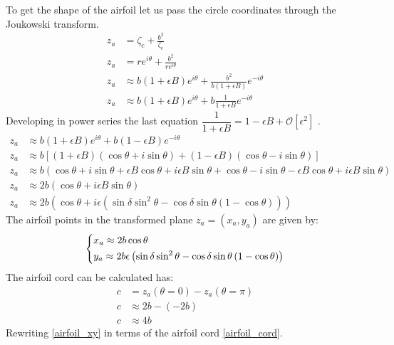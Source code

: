 To get the shape of the airfoil let us pass the circle coordinates through the Joukowski transform.
\begin{align}
    z_a &= \zeta_c + \frac{b^2}{\zeta_c}\\
    z_a &= re^{i\theta} + \frac{b^2}{re^{i\theta}}\\
    z_a &\approx b\left(1 + \epsilon B \right)e^{i\theta} + \frac{b^2}{b\left(1 + \epsilon B \right)}e^{-i\theta}\\
    z_a &\approx b\left(1 + \epsilon B \right)e^{i\theta} + b\frac{1}{1+\epsilon B}e^{-i\theta}
\end{align}
Developing in power series the last equation $\dfrac{1}{1+\epsilon B} =  1-\epsilon B + \mathcal{O}[\epsilon^2]$ .
\begin{align}
   z_a & \approx b\left(1+\epsilon B \right)e^{i\theta} + b\left(1-\epsilon B \right)e^{-i\theta} \\
   z_a & \approx b\left[ \left(1+\epsilon B\right)\left(\cos\theta + i\sin\theta \right) + \left(1-\epsilon B \right) \left(\cos\theta - i\sin\theta \right) \right]\\
   z_a & \approx b\left(  \cos\theta + i\sin\theta  +  \epsilon B\cos\theta + i\epsilon B\sin\theta +  \cos\theta - i\sin\theta    -\epsilon B\cos\theta + i\epsilon B\sin\theta \right)\\
   z_a & \approx 2b\left(\cos\theta +  i\epsilon B\sin\theta \right) \\
   z_a & \approx 2b\left(\cos\theta +  i\epsilon  \left( \sin\delta \sin^2\theta - \cos\delta \sin\theta\left(1 -\cos\theta \right) \right) \right)
\end{align}
The airfoil points in the  transformed plane $z_a= (x_a,y_a)$ are given by:
\begin{equation}
    \begin{dcases}
        x_a \approx 2b\cos\theta \\
        y_a \approx 2b\epsilon \left( \sin\delta \sin^2\theta - \cos\delta \sin\theta \left(1 -\cos\theta \right) \right) 
    \end{dcases}
    \label{airfoil_xy}
\end{equation}
The airfoil cord can be calculated has:
\begin{align}
    c &= z_a(\theta=0)-z_a(\theta=\pi) \\
    c &\approx 2b-(-2b) \nonumber \\
    c &\approx 4b \label{airfoil_cord}
\end{align}
Rewriting \eqref{airfoil_xy} in terms of the airfoil cord \eqref{airfoil_cord}.
